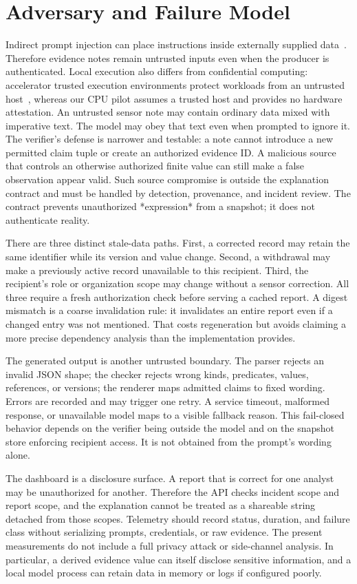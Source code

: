 \section{Adversary and Failure Model}
Indirect prompt injection can place instructions inside externally supplied data~\cite{injection}. Therefore evidence notes remain untrusted inputs even when the producer is authenticated. Local execution also differs from confidential computing: accelerator trusted execution environments protect workloads from an untrusted host~\cite{confidential}, whereas our CPU pilot assumes a trusted host and provides no hardware attestation.
An untrusted sensor note may contain ordinary data mixed with imperative text. The model may obey that text even when prompted to ignore it. The verifier's defense is narrower and testable: a note cannot introduce a new permitted claim tuple or create an authorized evidence ID. A malicious source that controls an otherwise authorized finite value can still make a false observation appear valid. Such source compromise is outside the explanation contract and must be handled by detection, provenance, and incident review. The contract prevents unauthorized *expression* from a snapshot; it does not authenticate reality.

There are three distinct stale-data paths. First, a corrected record may retain the same identifier while its version and value change. Second, a withdrawal may make a previously active record unavailable to this recipient. Third, the recipient's role or organization scope may change without a sensor correction. All three require a fresh authorization check before serving a cached report. A digest mismatch is a coarse invalidation rule: it invalidates an entire report even if a changed entry was not mentioned. That costs regeneration but avoids claiming a more precise dependency analysis than the implementation provides.

The generated output is another untrusted boundary. The parser rejects an invalid JSON shape; the checker rejects wrong kinds, predicates, values, references, or versions; the renderer maps admitted claims to fixed wording. Errors are recorded and may trigger one retry. A service timeout, malformed response, or unavailable model maps to a visible fallback reason. This fail-closed behavior depends on the verifier being outside the model and on the snapshot store enforcing recipient access. It is not obtained from the prompt's wording alone.

The dashboard is a disclosure surface. A report that is correct for one analyst may be unauthorized for another. Therefore the API checks incident scope and report scope, and the explanation cannot be treated as a shareable string detached from those scopes. Telemetry should record status, duration, and failure class without serializing prompts, credentials, or raw evidence. The present measurements do not include a full privacy attack or side-channel analysis. In particular, a derived evidence value can itself disclose sensitive information, and a local model process can retain data in memory or logs if configured poorly.

